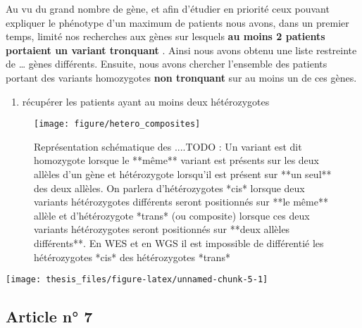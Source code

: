 \documentclass[12pt,twoside]{reedthesis}
\providecommand{\tightlist}{%
  \setlength{\itemsep}{0pt}\setlength{\parskip}{0pt}}
\theoremstyle{definition}
\theoremstyle{definition}
\theoremstyle{remark}
\begin{document}
  \newpage
  
  Au vu du grand nombre de gène, et afin d'étudier en priorité ceux
  pouvant expliquer le phénotype d'un maximum de patients nous avons, dans
  un premier temps, limité nos recherches aux gènes sur lesquels
  \textbf{au moins 2 patients portaient un variant tronquant} . Ainsi nous
  avons obtenu une liste restreinte de \ldots{} gènes différents. Ensuite,
  nous avons chercher l'ensemble des patients portant des variants
  homozygotes \textbf{non tronquant} sur au moins un de ces gènes.
  
  \begin{enumerate}
  \def\labelenumi{\arabic{enumi}.}
  \setcounter{enumi}{2}
  \tightlist
  \item
    récupérer les patients ayant au moins deux hétérozygotes
  \end{enumerate}
  
  \begin{figure}
  
  {\centering \texttt{[image: figure/hetero\_composites]} 
  
  }
  
  \caption[Représentation schématique des ....TODO]{Représentation schématique des ....TODO : Un variant est dit homozygote lorsque le **même** variant est présents sur les deux allèles d'un gène et hétérozygote lorsqu'il est présent sur **un seul** des deux allèles. On parlera d'hétérozygotes *cis* lorsque deux variants hétérozygotes différents seront positionnés sur **le même** allèle et d'hétérozygote *trans* (ou composite) lorsque ces deux variants hétérozygotes seront positionnés sur **deux allèles différents**. En WES et en WGS il est impossible de différentié les hétérozygotes *cis* des hétérozygotes *trans*}\label{fig:piccompositehet}
  \end{figure}
  
  \begin{center}\texttt{[image: thesis\_files/figure-latex/unnamed-chunk-5-1]} \end{center}
  
  \hypertarget{section}{\paragraph{}\label{section}}
  
  \subsection{Article n° 7}\label{article-n-7}
  
\end{document}
